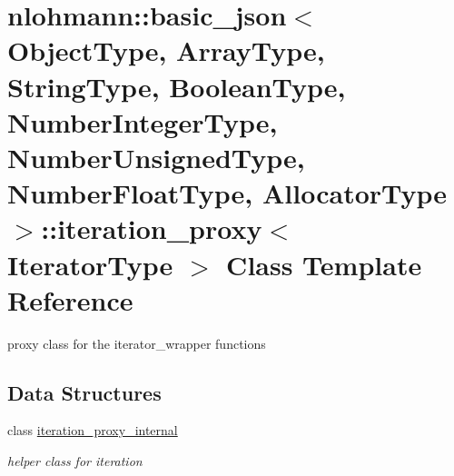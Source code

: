 \hypertarget{classnlohmann_1_1basic__json_1_1iteration__proxy}{\section{nlohmann\-:\-:basic\-\_\-json$<$ Object\-Type, Array\-Type, String\-Type, Boolean\-Type, Number\-Integer\-Type, Number\-Unsigned\-Type, Number\-Float\-Type, Allocator\-Type $>$\-:\-:iteration\-\_\-proxy$<$ Iterator\-Type $>$ Class Template Reference}
\label{classnlohmann_1_1basic__json_1_1iteration__proxy}
}


proxy class for the iterator\-\_\-wrapper functions  


\subsection*{Data Structures}
\begin{DoxyCompactItemize}
\item 
class \hyperlink{classnlohmann_1_1basic__json_1_1iteration__proxy_1_1iteration__proxy__internal}{iteration\-\_\-proxy\-\_\-internal}
\begin{DoxyCompactList}\small\item\em helper class for iteration \end{DoxyCompactList}\end{DoxyCompactItemize}
